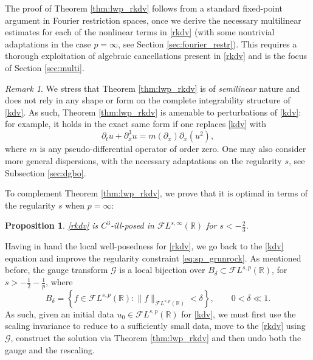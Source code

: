 \documentclass[%
11pt,  reqno]{amsart}
\newcommand{\5}{\textup{V}}
\newcommand{\noi}{\noindent}
\newcommand{\FL}{\mathcal{F} L}
\newcommand{\dx}{\partial_x}
\newcommand{\dt}{\partial_t}
\newtheorem{proposition}[theorem]{Proposition}
\theoremstyle{remark}
\newtheorem{remark}[theorem]{Remark}
\newcommand{\R}{\mathbb{R}}
\newcommand{\Gc}{\mathcal{G}}
\numberwithin{equation}{section}
\numberwithin{theorem}{section}
\newcommand{\simao}[1]{\marginpar{\color{red} $\Leftarrow\Leftarrow\Leftarrow$}{\smallskip \noi\color{red}SIMAO: #1}\smallskip}
\begin{document}
The proof of Theorem \ref{thm:lwp_rkdv} follows from a standard fixed-point argument in  Fourier restriction spaces,  once we derive the necessary multilinear estimates for each of the nonlinear terms in \eqref{rkdv} (with some nontrivial adaptations in the case $p=\infty$, see Section \ref{sec:fourier_restr}). This requires a thorough exploitation of algebraic cancellations present in \eqref{rkdv} and is the focus of Section \ref{sec:multi}. 

		

	\begin{remark}
		We stress that Theorem \ref{thm:lwp_rkdv} is of \emph{semilinear} nature and does not rely in any shape or form on the complete integrability structure of \eqref{kdv}. As such, Theorem \ref{thm:lwp_rkdv} is amenable to perturbations of \eqref{kdv}: for example, it holds in the exact same form if one replaces \eqref{kdv} with
		\begin{equation}
			\partial_t u + \partial_x^3 u = m(\partial_x)\partial_x(u^2),
		\end{equation}
		where $m$ is any pseudo-differential operator of order zero. One may also consider more general dispersions, with the necessary adaptations on the regularity $s$, see Subsection \ref{sec:dgbo}.
	\end{remark}



To complement Theorem \ref{thm:lwp_rkdv}, we prove that it is optimal in terms of the regularity $s$ when $p=\infty$:
    \begin{proposition}\label{prop_C3_ill}
\eqref{rkdv} is $C^3$-ill-posed in $\mathcal{F}L^{s,\infty}(\R)$ for  $s<-\frac23$.
    \end{proposition}






Having in hand the local well-posedness for \eqref{rkdv}, we go back to the \eqref{kdv} equation and improve the regularity constraint \eqref{eq:sp_grunrock}. As mentioned before, the gauge transform $\Gc$ is a local bijection over $B_\delta\subset \FL^{s,p}(\R)$, for $s>-\frac12-\frac1p$, where
$$
B_\delta=\left\{ f \in \FL^{s,p}(\R): \|f\|_{\FL^{s,p}(\R)}<\delta\right\},\qquad 0<\delta\ll 1.
$$
As such, given an initial data $u_0\in \FL^{s,p}(\R)$ for \eqref{kdv}, we must first use the scaling invariance to reduce to a sufficiently small data, move to the \eqref{rkdv} using $\Gc$, construct the solution via Theorem \ref{thm:lwp_rkdv} and then undo both the gauge and the rescaling.
\end{document}
